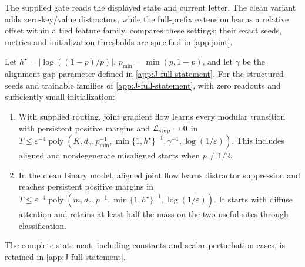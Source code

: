The supplied gate reads the displayed state and current letter. The clean variant adds
zero-key/value distractors, while the full-prefix extension learns a relative offset within a
tied feature family.  compares these settings; their exact seeds,
metrics and initialization thresholds are specified in \cref{app:joint}.

\begin{table}[t]
\centering\small
{}
\caption{Three complementary step-learning settings. Full-prefix routing uses a planted tied feature and unequal fixed mobilities; it does not subsume the other guarantees.}
\label{tab:step-settings}
\end{table}

\begin{theorem}
\label{thm:joint}
Let $h^\star=|\log((1-p)/p)|$, $p_{\min}=\min(p,1-p)$, and let $\gamma$
be the alignment-gap parameter defined in \cref{app:J-full-statement}.
For the structured seeds and trainable families of \cref{app:J-full-statement},
with zero readouts and sufficiently small initialization:
\begin{enumerate}[label=(\roman*),leftmargin=*,itemsep=0pt,topsep=2pt]
\item With supplied routing, joint gradient flow learns every modular transition
with persistent positive margins and $\mathcal L_{\mathrm{step}}\to0$ in
$T\le\varepsilon^{-4}\operatorname{poly}(K,d_{\mathrm h},p_{\min}^{-1},
\min\{1,h^\star\}^{-1},\gamma^{-1},\log(1/\varepsilon))$.
This includes aligned and nondegenerate misaligned starts when $p\ne1/2$.
\item In the clean binary model, aligned joint flow learns distractor suppression
and reaches persistent positive margins in
$T\le\varepsilon^{-4}\operatorname{poly}(m,d_{\mathrm h},p^{-1},
\min\{1,h^\star\}^{-1},\log(1/\varepsilon))$.
It starts with diffuse attention and retains at least half the mass on the two
useful sites through classification.
\end{enumerate}
The complete statement, including constants and scalar-perturbation cases,
is retained in \cref{app:J-full-statement}.
\end{theorem}

